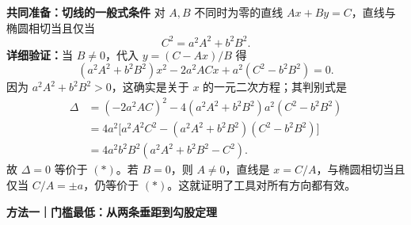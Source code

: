 \begin{proofbox}
  \medskip
  \textbf{\textcolor{CProof}{共同准备：切线的一般式条件}}
  对 $A,B$ 不同时为零的直线 $Ax+By=C$，直线与椭圆相切当且仅当
  \[
    \boxed{C^2=a^2A^2+b^2B^2}.\tag{*}
  \]
  \textbf{详细验证：}当 $B\ne0$，代入 $y=(C-Ax)/B$ 得
  \[
    (a^2A^2+b^2B^2)x^2-2a^2ACx+a^2(C^2-b^2B^2)=0.
  \]
  因为 $a^2A^2+b^2B^2>0$，这确实是关于 $x$ 的一元二次方程；其判别式是
  \[
  \begin{aligned}
    \Delta
     &=(-2a^2AC)^2-4(a^2A^2+b^2B^2)a^2(C^2-b^2B^2)\\
     &=4a^2\bigl[a^2A^2C^2-(a^2A^2+b^2B^2)(C^2-b^2B^2)\bigr]\\
     &=4a^2b^2B^2(a^2A^2+b^2B^2-C^2).
  \end{aligned}
  \]
  故 $\Delta=0$ 等价于 $(*)$。若 $B=0$，则 $A\ne0$，直线是 $x=C/A$，与椭圆相切当且仅当 $C/A=\pm a$，仍等价于 $(*)$。这就证明了工具对所有方向都有效。

  \medskip
  \begin{minipage}{\linewidth}
  \textbf{\textcolor{CProof}{方法一｜门槛最低：从两条垂距到勾股定理}}


\end{minipage}
\end{proofbox}
